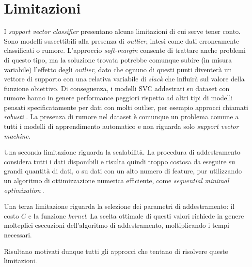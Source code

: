 \section{Limitazioni}\label{sec:svc_limiti}
I \emph{support vector classifier} presentano alcune limitazioni di cui serve tener conto. 
Sono modelli suscettibili alla presenza di \emph{outlier}, intesi come dati erroneamente classificati o rumore. L'approccio \emph{soft-margin} consente di trattare anche problemi di questo tipo, ma la soluzione trovata potrebbe comunque subire (in misura variabile) l'effetto degli \emph{outlier}, dato che ognuno di questi punti diventerà un vettore di supporto con una relativa variabile di \emph{slack} che influirà sul valore della funzione obiettivo. 
Di conseguenza, i modelli SVC addestrati su dataset con rumore hanno in genere performance peggiori rispetto ad altri tipi di modelli pensati specificatamente per dati con molti outlier, per esempio approcci chiamati \emph{robusti} \cite{2019_robust_classification}.
La presenza di rumore nel dataset è comunque un problema comune a tutti i modelli di apprendimento automatico e non riguarda solo \emph{support vector machine}.

Una seconda limitazione riguarda la scalabilità. La procedura di addestramento considera tutti i dati disponibili e risulta quindi troppo costosa da eseguire su grandi quantità di dati, o su dati con un alto numero di feature, pur utilizzando un algoritmo di ottimizzazione numerica efficiente, come \emph{sequential minimal optimization} \cite{SMO}.

Una terza limitazione riguarda la selezione dei parametri di addestramento: il costo $C$ e la funzione \emph{kernel}. La scelta ottimale di questi valori richiede in genere molteplici esecuzioni dell'algoritmo di addestramento, moltiplicando i tempi necessari.

Risultano motivati dunque tutti gli approcci che tentano di risolvere queste limitazioni. 

